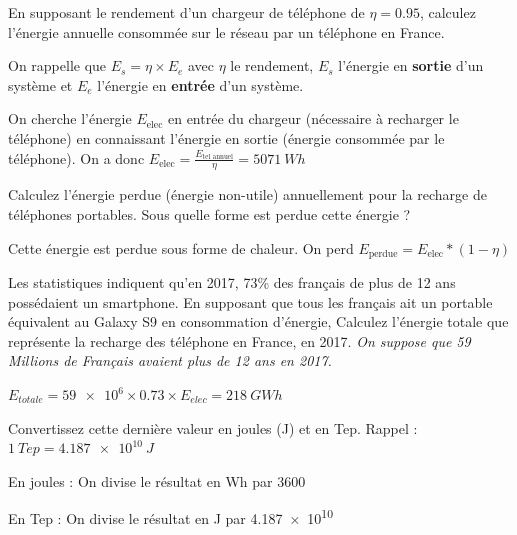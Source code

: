 \documentclass[10pt,fleqn]{article} %
\begin{document}
\begin{exercise}
\begin{question}
  En supposant le rendement d'un chargeur de téléphone de $\eta = 0.95$, calculez l'énergie annuelle consommée sur le réseau par un téléphone en France.

  On rappelle que $E_s = \eta \times E_e$ avec $\eta$ le rendement, $E_s$ l'énergie en \textbf{sortie} d'un système et $E_e$ l'énergie en \textbf{entrée} d'un système.
\end{question}
\begin{solution}
  On cherche l'énergie $E_{\text{elec}}$ en entrée du chargeur (nécessaire à recharger le téléphone) en connaissant l'énergie en sortie (énergie consommée par le téléphone). On a donc $ E_{\text{elec}} = \frac{E_{\text{tel annuel}}}{\eta} = \SI{5071}{Wh}$
\end{solution}

\begin{question}
Calculez l'énergie perdue (énergie non-utile) annuellement pour la recharge de téléphones portables. Sous quelle forme est perdue cette énergie ?
\end{question}
\begin{solution}
  Cette énergie est perdue sous forme de chaleur. On perd $E_{\text{perdue}} = E_{\text{elec}} * (1-\eta) $
\end{solution}

\begin{question}
  Les statistiques indiquent qu'en 2017, 73\% des français de plus de 12 ans possédaient un smartphone. En supposant que tous les français ait un portable équivalent au Galaxy S9 en consommation d'énergie, Calculez l'énergie totale que représente la recharge des téléphone en France, en 2017.
  \textit{On suppose que 59 Millions de Français avaient plus de 12 ans en 2017. }
\end{question}
\begin{solution}
  $E_{totale} = \num{59e6}\times 0.73 \times E_{elec}  = \SI{218}{GWh}$
\end{solution}

\begin{question}
Convertissez cette dernière valeur en joules (J) et en Tep. Rappel : $\SI{1}{Tep} = \SI{4.187e10}{J}$
\end{question}
\begin{solution}
  En joules : On divise le résultat en Wh par 3600

  En Tep : On divise le résultat en J par \num{4.187e10}
\end{solution}
\end{exercise}
\end{document}
